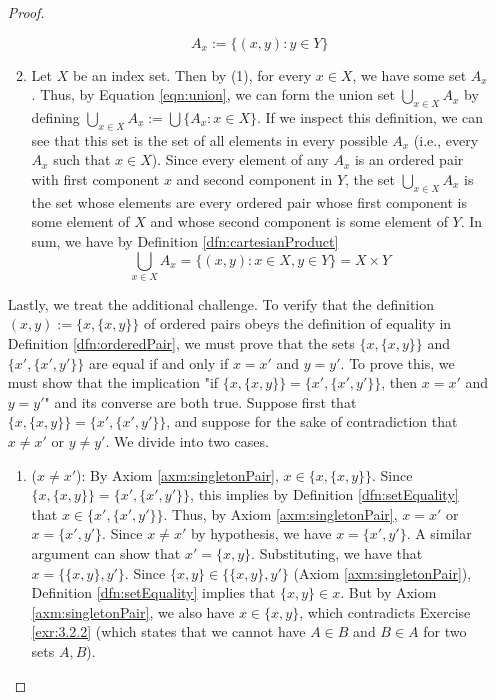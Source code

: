 \documentclass[../main.tex]{subfiles}
\begin{document}
\begin{enumerate}[ref={\thesection.\arabic*}]
\begin{proof}
\begin{enumerate}[label={(\arabic*)}]
            \begin{equation*}
                A_x := \{(x,y):y\in Y\}
            \end{equation*}
            \item Let $X$ be an index set. Then by (1), for every $x\in X$, we have some set $A_x$. Thus, by Equation \ref{eqn:union}, we can form the union set $\bigcup_{x\in X}A_x$ by defining $\bigcup_{x\in X}A_x:=\bigcup\{A_x:x\in X\}$. If we inspect this definition, we can see that this set is the set of all elements in every possible $A_x$ (i.e., every $A_x$ such that $x\in X$). Since every element of any $A_x$ is an ordered pair with first component $x$ and second component in $Y$, the set $\bigcup_{x\in X}A_x$ is the set whose elements are every ordered pair whose first component is some element of $X$ and whose second component is some element of $Y$. In sum, we have by Definition \ref{dfn:cartesianProduct}
            \begin{equation*}
                \bigcup_{x\in X}A_x = \{(x,y):x\in X,y\in Y\} = X\times Y
            \end{equation*}
        \end{enumerate}
        \medskip
        Lastly, we treat the additional challenge. To verify that the definition $(x,y):=\{x,\{x,y\}\}$ of ordered pairs obeys the definition of equality in Definition \ref{dfn:orderedPair}, we must prove that the sets $\{x,\{x,y\}\}$ and $\{x',\{x',y'\}\}$ are equal if and only if $x=x'$ and $y=y'$. To prove this, we must show that the implication "if $\{x,\{x,y\}\}=\{x',\{x',y'\}\}$, then $x=x'$ and $y=y'$" and its converse are both true. Suppose first that $\{x,\{x,y\}\}=\{x',\{x',y'\}\}$, and suppose for the sake of contradiction that $x\neq x'$ or $y\neq y'$. We divide into two cases.
        \begin{enumerate}[label={(\arabic*)}]
            \item ($x\neq x'$): By Axiom \ref{axm:singletonPair}, $x\in\{x,\{x,y\}\}$. Since $\{x,\{x,y\}\}=\{x',\{x',y'\}\}$, this implies by Definition \ref{dfn:setEquality} that $x\in\{x',\{x',y'\}\}$. Thus, by Axiom \ref{axm:singletonPair}, $x=x'$ or $x=\{x',y'\}$. Since $x\neq x'$ by hypothesis, we have $x=\{x',y'\}$. A similar argument can show that $x'=\{x,y\}$. Substituting, we have that $x=\{\{x,y\},y'\}$. Since $\{x,y\}\in\{\{x,y\},y'\}$ (Axiom \ref{axm:singletonPair}), Definition \ref{dfn:setEquality} implies that $\{x,y\}\in x$. But by Axiom \ref{axm:singletonPair}, we also have $x\in\{x,y\}$, which contradicts Exercise \ref{exr:3.2.2} (which states that we cannot have $A\in B$ and $B\in A$ for two sets $A,B$).

\end{enumerate}
\end{proof}
\end{enumerate}
\end{document}
